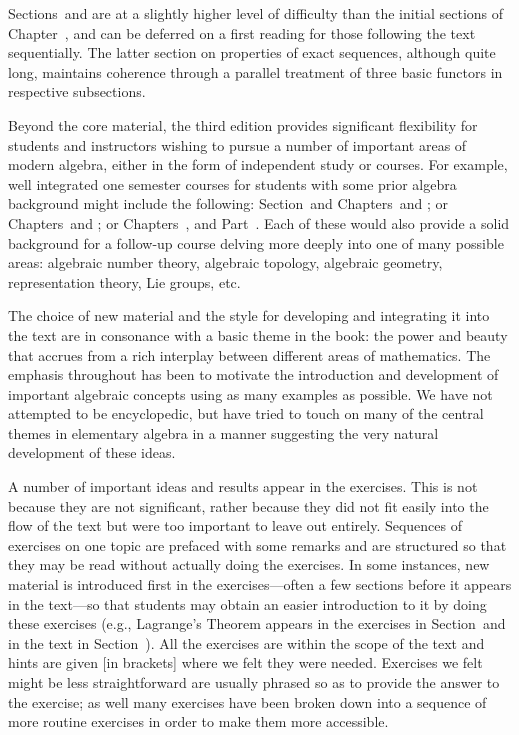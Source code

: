   Sections~\in[sect:10.04] and \in[sect:10.05] are at a slightly higher level of difficulty than the initial sections of Chapter~\in[chap:10], and can be deferred on a first reading for those following the text sequentially. The latter section on properties of exact sequences, although quite long, maintains coherence through a parallel treatment of three basic functors in respective subsections.

  Beyond the core material, the third edition provides significant flexibility for students and instructors wishing to pursue a number of important areas of modern algebra, either in the form of independent study or courses. For example, well integrated one semester courses for students with some prior algebra background might include the following: Section~\in[sect:09.06] and Chapters~\in[chap:15] and \in[chap:16]; or Chapters~\in[chap:10] and \in[chap:17]; or Chapters~\in[chap:05], \in[chap:06] and Part~\in[part:06]. Each of these would also provide a solid background for a follow-up course delving more deeply into one of many possible areas: algebraic number theory, algebraic topology, algebraic geometry, representation theory, Lie groups, etc.

  The choice of new material and the style for developing and integrating it into the text are in consonance with a basic theme in the book: the power and beauty that accrues from a rich interplay between different areas of mathematics. The emphasis throughout has been to motivate the introduction and development of important algebraic concepts using as many examples as possible. We have not attempted to be encyclopedic, but have tried to touch on many of the central themes in elementary algebra in a manner suggesting the very natural development of these ideas.

  A number of important ideas and results appear in the exercises. This is not because they are not significant, rather because they did not fit easily into the flow of the text but were too important to leave out entirely. Sequences of exercises on one topic are prefaced with some remarks and are structured so that they may be read without actually doing the exercises. In some instances, new material is introduced first in the exercises---often a few sections before it appears in the text---so that students may obtain an easier introduction to it by doing these exercises (e.g., Lagrange's Theorem appears in the exercises in Section~\in[sect:01.07] and in the text in Section~\in[sect:03.02]). All the exercises are within the scope of the text and hints are given [in brackets] where we felt they were needed. Exercises we felt might be less straightforward are usually phrased so as to provide the answer to the exercise; as well many exercises have been broken down into a sequence of more routine exercises in order to make them more accessible.

